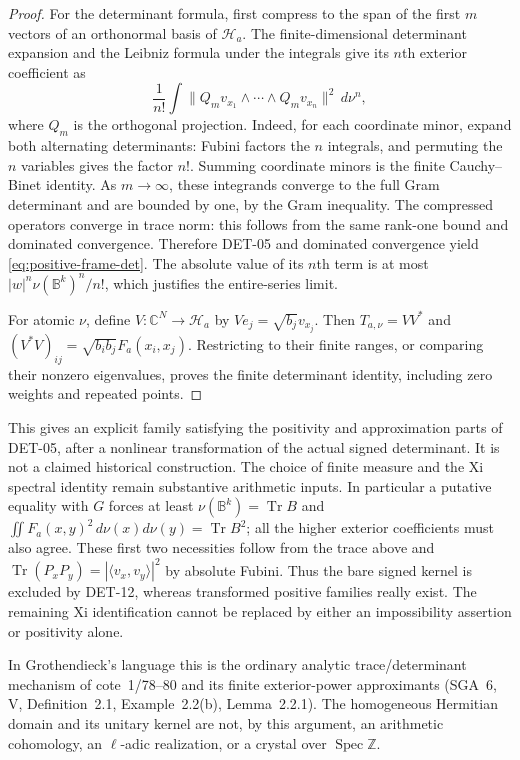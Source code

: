 \begin{proof}
For the determinant formula, first compress to the span of the first $m$
vectors of an orthonormal basis of $\mathcal H_a$.  The finite-dimensional
determinant expansion and the Leibniz formula under the integrals give its
$n$th exterior coefficient as
\[
 \frac1{n!}\int
 \|Q_mv_{x_1}\wedge\cdots\wedge Q_mv_{x_n}\|^2\,d\nu^n,
\]
where $Q_m$ is the orthogonal projection.  Indeed, for each coordinate minor,
expand both alternating determinants: Fubini factors the $n$ integrals, and
permuting the $n$ variables gives the factor $n!$.  Summing coordinate minors
is the finite Cauchy--Binet identity.  As $m\to\infty$, these integrands
converge to the full Gram determinant and are bounded by one, by the Gram
inequality.  The compressed operators converge in trace norm: this follows
from the same rank-one bound and dominated convergence.  Therefore DET-05
and dominated convergence yield \eqref{eq:positive-frame-det}.  The absolute
value of its $n$th term is at most
$|w|^n\nu(\mathbb B^k)^n/n!$, which justifies the entire-series limit.

For atomic $\nu$, define $V:\mathbb C^N\to\mathcal H_a$ by
$Ve_j=\sqrt{b_j}v_{x_j}$.  Then $T_{a,\nu}=VV^*$ and
$(V^*V)_{ij}=\sqrt{b_i b_j}F_a(x_i,x_j)$.  Restricting to their finite
ranges, or comparing their nonzero eigenvalues, proves the finite determinant
identity, including zero weights and repeated points.
\end{proof}

This gives an explicit family satisfying the positivity and approximation
parts of DET-05, after a nonlinear transformation of the actual signed
determinant.  It is not a claimed historical construction.  The choice of
finite measure and the Xi spectral identity remain substantive arithmetic
inputs.  In particular a putative equality with $G$ forces at least
$\nu(\mathbb B^k)=\operatorname{Tr}B$ and
$\iint F_a(x,y)^2\,d\nu(x)d\nu(y)=\operatorname{Tr}B^2$; all the higher
exterior coefficients must also agree.  These first two necessities follow
from the trace above and
$\operatorname{Tr}(P_xP_y)=|\langle v_x,v_y\rangle|^2$ by absolute Fubini.
Thus the bare signed kernel is excluded by DET-12, whereas transformed
positive families really exist.  The remaining Xi identification cannot be
replaced by either an impossibility assertion or positivity alone.

In Grothendieck's language this is the ordinary analytic trace/determinant
mechanism of cote~1/78--80 and its finite exterior-power approximants
(SGA~6, V, Definition~2.1, Example~2.2(b), Lemma~2.2.1).  The homogeneous
Hermitian domain and its unitary kernel are not, by this argument, an
arithmetic cohomology, an $\ell$-adic realization, or a crystal over
$\operatorname{Spec}\mathbb Z$.
